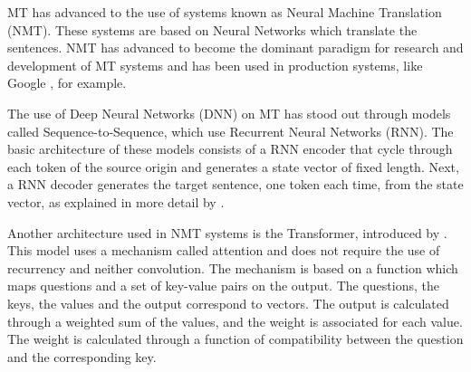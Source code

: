 \documentclass[a4paper]{article}
\begin{document}
    MT has advanced to the use of systems known as 
    Neural Machine Translation (NMT). These systems are based on Neural 
    Networks which translate the sentences.
    NMT has advanced to become the dominant paradigm for research and 
    development of  MT systems and has been used in production systems,
    like Google \cite{wu:2016}, for example.

    The use of Deep Neural Networks (DNN) on MT has stood out through 
    models called Sequence-to-Sequence, which use Recurrent Neural Networks
    (RNN). The basic architecture of these models consists of a RNN encoder
    that cycle through each token of the source origin and generates a 
    state vector of fixed length.
    Next, a RNN decoder generates the target sentence, one token each time,
    from the state vector, as explained in more detail by \cite{sutskever:2014}.

    Another architecture used in NMT systems is the Transformer, introduced 
    by \cite{vaswani:2017attention}. This model uses a mechanism called attention 
    and does not require the use of recurrency and neither convolution. 
    The mechanism is based on a function which maps questions and a set of 
    key-value pairs on the output.
    The questions, the keys, the values and the output correspond to vectors.
    The output is calculated through a weighted sum of the values, and the 
    weight is associated for each value. The weight is calculated through
    a function of compatibility between the question and the corresponding 
    key.


 
\end{document}
